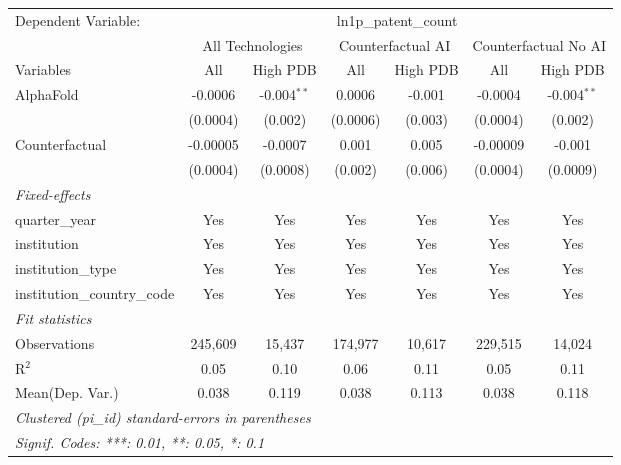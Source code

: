 \begingroup
\centering
\begin{tabular}{lcccccc}
   \tabularnewline \midrule \midrule
   Dependent Variable: & \multicolumn{6}{c}{ln1p\_patent\_count}\\
 & \multicolumn{2}{c}{All Technologies} & \multicolumn{2}{c}{Counterfactual AI} & \multicolumn{2}{c}{Counterfactual No AI} \\
\cmidrule(lr){1-1}\cmidrule(lr){2-3} \cmidrule(lr){4-5} \cmidrule(lr){6-7}
Variables & \multicolumn{1}{c}{All} & \multicolumn{1}{c}{High PDB} & \multicolumn{1}{c}{All} & \multicolumn{1}{c}{High PDB} & \multicolumn{1}{c}{All} & \multicolumn{1}{c}{High PDB} \\
\cmidrule(lr){1-1}\cmidrule(lr){2-2} \cmidrule(lr){3-3} \cmidrule(lr){4-4} \cmidrule(lr){5-5} \cmidrule(lr){6-6} \cmidrule(lr){7-7}
   AlphaFold                    & -0.0006  & -0.004$^{**}$ & 0.0006   & -0.001  & -0.0004  & -0.004$^{**}$\\   
                                & (0.0004) & (0.002)       & (0.0006) & (0.003) & (0.0004) & (0.002)\\   
   Counterfactual               & -0.00005 & -0.0007       & 0.001    & 0.005   & -0.00009 & -0.001\\   
                                & (0.0004) & (0.0008)      & (0.002)  & (0.006) & (0.0004) & (0.0009)\\   
   \midrule
   \emph{Fixed-effects}\\
   quarter\_year                & Yes      & Yes           & Yes      & Yes     & Yes      & Yes\\  
   institution                  & Yes      & Yes           & Yes      & Yes     & Yes      & Yes\\  
   institution\_type            & Yes      & Yes           & Yes      & Yes     & Yes      & Yes\\  
   institution\_country\_code   & Yes      & Yes           & Yes      & Yes     & Yes      & Yes\\  
   \midrule
   \emph{Fit statistics}\\
   Observations                 & 245,609  & 15,437        & 174,977  & 10,617  & 229,515  & 14,024\\  
   R$^2$                        & 0.05     & 0.10          & 0.06     & 0.11    & 0.05     & 0.11\\  
Mean(Dep. Var.) & 0.038 & 0.119 & 0.038 & 0.113 & 0.038 & 0.118 \\
   \midrule \midrule
   \multicolumn{7}{l}{\emph{Clustered (pi\_id) standard-errors in parentheses}}\\
   \multicolumn{7}{l}{\emph{Signif. Codes: ***: 0.01, **: 0.05, *: 0.1}}\\
\end{tabular}
\par\endgroup
